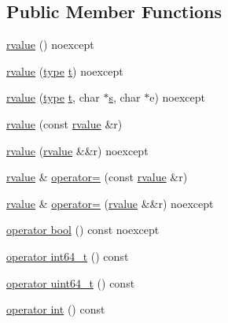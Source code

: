 \subsection*{Public Member Functions}
\begin{DoxyCompactItemize}
\item 
\hyperlink{classcrow_1_1json_1_1rvalue_aa2db11774ac831fe243a0e3511946a40}{rvalue} () noexcept
\item 
\hyperlink{classcrow_1_1json_1_1rvalue_a8b4e22b077d735b29aafc1c1a7e01366}{rvalue} (\hyperlink{namespacecrow_1_1json_adb9569a402d1b289a75025c8c96e5d99}{type} \hyperlink{classcrow_1_1json_1_1rvalue_a596957ce615a71afba8517d066554383}{t}) noexcept
\item 
\hyperlink{classcrow_1_1json_1_1rvalue_a9eb58f152c08db64e400ebf90df2889e}{rvalue} (\hyperlink{namespacecrow_1_1json_adb9569a402d1b289a75025c8c96e5d99}{type} \hyperlink{classcrow_1_1json_1_1rvalue_a596957ce615a71afba8517d066554383}{t}, char $\ast$\hyperlink{classcrow_1_1json_1_1rvalue_aa7ee454f63af32da93233510e60cbe8f}{s}, char $\ast$e) noexcept
\item 
\hyperlink{classcrow_1_1json_1_1rvalue_a834f64380b3479a4497b2ca212559320}{rvalue} (const \hyperlink{classcrow_1_1json_1_1rvalue}{rvalue} \&r)
\item 
\hyperlink{classcrow_1_1json_1_1rvalue_ab37b37402eb83aed531868b6a1763f66}{rvalue} (\hyperlink{classcrow_1_1json_1_1rvalue}{rvalue} \&\&r) noexcept
\item 
\hyperlink{classcrow_1_1json_1_1rvalue}{rvalue} \& \hyperlink{classcrow_1_1json_1_1rvalue_a55b4af62617cf9103cc301892fd6540b}{operator=} (const \hyperlink{classcrow_1_1json_1_1rvalue}{rvalue} \&r)
\item 
\hyperlink{classcrow_1_1json_1_1rvalue}{rvalue} \& \hyperlink{classcrow_1_1json_1_1rvalue_a8a6a649a29ef3f3940cb981fb1248076}{operator=} (\hyperlink{classcrow_1_1json_1_1rvalue}{rvalue} \&\&r) noexcept
\item 
\hyperlink{classcrow_1_1json_1_1rvalue_ad8fc5549160087130e44b383a46b4d7c}{operator bool} () const noexcept
\item 
\hyperlink{classcrow_1_1json_1_1rvalue_a94e5c69a62fde0ef9273de2ead363d18}{operator int64\-\_\-t} () const 
\item 
\hyperlink{classcrow_1_1json_1_1rvalue_a020b1cb9d5d3245553afcb4a531d50c0}{operator uint64\-\_\-t} () const 
\item 
\hyperlink{classcrow_1_1json_1_1rvalue_ab29bcad01c1aa1afdea9e4e38c0161b7}{operator int} () const 
\item 

\end{DoxyCompactItemize}
